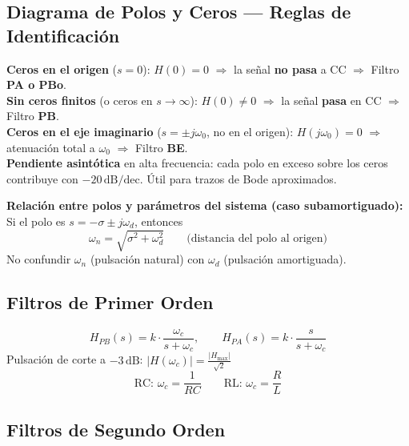 \documentclass[12pt,a4paper]{article}
\begin{document}
\subsection{Diagrama de Polos y Ceros — Reglas de Identificación}

\begin{formulabox}
\textbf{Ceros en el origen} ($s = 0$): $H(0) = 0$ $\Rightarrow$ la señal \textbf{no
pasa} a CC $\Rightarrow$ Filtro \textbf{PA o PBo}.\\[4pt]
\textbf{Sin ceros finitos} (o ceros en $s\to\infty$): $H(0) \neq 0$ $\Rightarrow$
la señal \textbf{pasa} en CC $\Rightarrow$ Filtro \textbf{PB}.\\[4pt]
\textbf{Ceros en el eje imaginario} ($s = \pm j\omega_0$, no en el origen):
$H(j\omega_0) = 0$ $\Rightarrow$ atenuación total a $\omega_0$ $\Rightarrow$
Filtro \textbf{BE}.\\[4pt]
\textbf{Pendiente asintótica} en alta frecuencia: cada polo en exceso sobre los ceros
contribuye con $-20\,\text{dB/dec}$. Útil para trazos de Bode aproximados.
\end{formulabox}

\medskip
\textbf{Relación entre polos y parámetros del sistema (caso subamortiguado):}
Si el polo es $s = -\sigma \pm j\omega_d$, entonces
\[
  \omega_n = \sqrt{\sigma^2 + \omega_d^2}
  \qquad\text{(distancia del polo al origen)}
\]
No confundir $\omega_n$ (pulsación natural) con $\omega_d$ (pulsación amortiguada).

\subsection{Filtros de Primer Orden}

\begin{formulabox}
\[
  H_{PB}(s) = k\cdot\frac{\omega_c}{s+\omega_c}, \qquad
  H_{PA}(s) = k\cdot\frac{s}{s+\omega_c}
\]
Pulsación de corte a $-3\,\text{dB}$:
$\displaystyle|H(\omega_c)| = \frac{|H_{\max}|}{\sqrt{2}}$
\[
  \text{RC: }\omega_c = \frac{1}{RC} \qquad \text{RL: }\omega_c = \frac{R}{L}
\]
\end{formulabox}

\subsection{Filtros de Segundo Orden}
\end{document}
